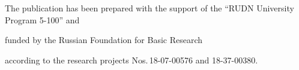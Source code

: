   




  







\vspace*{-18pt}





\Ack





\vspace*{-6pt}





\noindent


The publication has been prepared with the support of the ``RUDN University Program 5-100'' and 


funded by the Russian Foundation for Basic Research


 according to the research projects Nos.\,18-07-00576 and 18-37-00380.





\vspace*{-6pt}





\renewcommand{\bibname}{\protect\rmfamily References}







